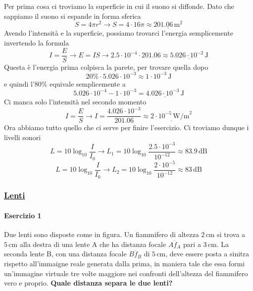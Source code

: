 Per prima cosa ci troviamo la superficie in cui il suono si diffonde. Dato che sappiamo il suono
si espande in forma sferica
\begin{equation*}
  S = 4\pi r^2 \rightarrow S = 4\cdot16\pi \approx \underline{201.06\,\text{m}^2}
\end{equation*}
Avendo l'intensità e la superficie, possiamo trovarci l'energia semplicemente invertendo la formula
\begin{equation*}
  I = \frac{E}{S} \rightarrow E = IS \rightarrow 2.5\cdot10^{-4}\cdot 201.06 \approx 
  \underline{5.026\cdot10^{-2}\,\text{J}}
\end{equation*}
Questa è l'energia prima colpisca la parete, per trovare quella dopo
\begin{equation*}
  20\%\cdot 5.026\cdot10^{-3} \approx 1\cdot10^{-3}\,\text{J}
\end{equation*}
e quindi l'$80\%$ equivale semplicemente a
\begin{equation*}
  5.026\cdot10^{-4} - 1\cdot10^{-3} = \underline{4.026\cdot10^{-3}\,\text{J}}
\end{equation*}
Ci manca solo l'intensità nel secondo momento
\begin{equation*}
  I = \frac{E}{S} \rightarrow I = \frac{4.026\cdot10^{-3}}{201.06} \approx
  \underline{2\cdot10^{-5}\,\text{W/m}^2}
\end{equation*}
Ora abbiamo tutto quello che ci serve per finire l'esercizio. Ci troviamo dunque i livelli sonori
\begin{equation*}
  L = 10\log_{10}\frac{I}{I_0} \rightarrow L_1 = 10\log_{10}\frac{2.5\cdot10^{-3}}{10^{-12}}
  \approx\boxed{83.9\,\text{dB}}
\end{equation*}
\begin{equation*}
  L = 10\log_{10}\frac{I}{I_0} \rightarrow L_2 = 10\log_{10}\frac{2\cdot10^{-5}}{10^{-12}}
  \approx\boxed{83\,\text{dB}}
\end{equation*}

\subsubsection*{\hyperref[subsec:onde:lenti]{Lenti}}\label{ex:lenti}
\paragraph{Esercizio 1}
Due lenti sono disposte come in figura. Un fiammifero di altezza $2\,\text{cm}$ si trova a 
$5\,\text{cm}$ alla destra di una lente A che ha distanza focale $\overline{Af_A}$ pari a 
$3\,\text{cm}$. La seconda lente B, con una distanza focale $\overline{Bf_B}$ di $5\,\text{cm}$, 
deve essere posta a sinitra rispetto all'immaigne reale generata dalla prima, in maniera tale che 
essa formi un'immagine virtuale tre volte maggiore nei confronti dell'altezza del fiammifero vero e 
proprio. \textbf{Quale distanza separa le due lenti?}

